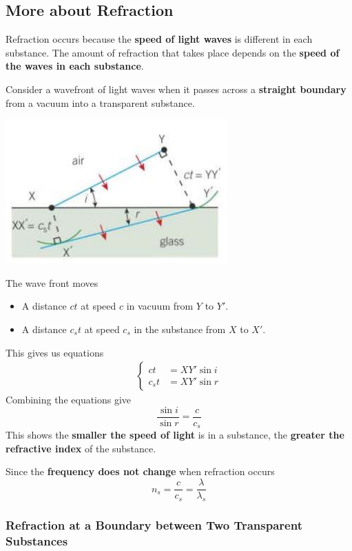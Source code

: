 \subsection{More about Refraction}

Refraction occurs because the \textbf{speed of light waves} is different in each substance. The amount of refraction that takes place depends on the \textbf{speed of the waves in each substance}.

Consider a wavefront of light waves when it passes across a \textbf{straight boundary} from a vacuum into a transparent substance.
\begin{center}
    \includegraphics{img/refraction}
\end{center}
The wave front moves
\begin{itemize}
    \item A distance $ct$ at speed $c$ in vacuum from $Y$ to $Y'$.
    \item A distance $c_st$ at speed $c_s$ in the substance from $X$ to $X'$.
\end{itemize}

This gives us equations
\begin{align*}
    \begin{cases}
        ct&=XY'\sin i\\
        c_st&=XY'\sin r
    \end{cases}
\end{align*}
Combining the equations give
$$\frac{\sin i}{\sin r}=\frac{c}{c_s}$$
This shows the \textbf{smaller the speed of light} is in a substance, the \textbf{greater the refractive index} of the substance.

Since the \textbf{frequency does not change} when refraction occurs
$$n_s=\frac{c}{c_s}=\frac{\lambda}{\lambda_s}$$

\subsubsection*{Refraction at a Boundary between Two Transparent Substances}

